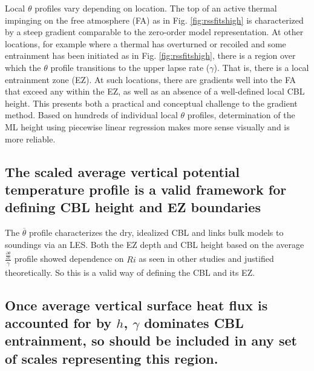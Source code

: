 Local $\theta$ profiles vary depending on location.  The top of an active thermal impinging on the free atmosphere (FA) as in Fig. \ref{fig:rssfitshigh} is characterized by a steep gradient comparable to the zero-order model representation.  At other locations, for example where a thermal has overturned or recoiled and some entrainment has been initiated as in Fig. \ref{fig:rssfitshigh}, there is a region over which the $\theta$ profile transitions to the upper lapse rate ($\gamma$). That is, there is a local entrainment zone (EZ).  At such locations, there are gradients well into the FA that exceed any within the EZ, as well as an absence of a well-defined local CBL height.  This presents both a practical and conceptual challenge to the gradient method.  Based on hundreds of individual local $\theta$ profiles, determination of the ML height using piecewise linear regression makes more sense visually and is more reliable. 

\subsection{The scaled average vertical potential temperature profile is a valid framework for defining CBL height and EZ boundaries}

The $\overline{\theta}$ profile characterizes the dry, idealized CBL and links bulk models to soundings via an LES.  Both the EZ depth and CBL height based on the average $\frac{\frac{\partial \overline{\theta}}{\partial z}}{\gamma}$ profile showed dependence on $Ri$ as seen in other studies and justified theoretically.  So this is a valid way of defining the CBL and its EZ.  

\subsection{Once average vertical surface heat flux is accounted for by $h$, $\gamma$ dominates CBL entrainment, so should be included in any set of scales representing this region.}

